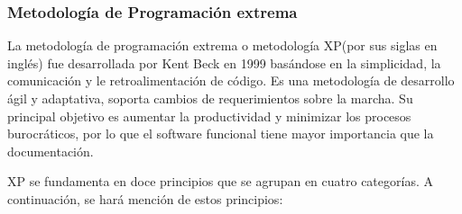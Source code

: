 \subsubsection{Metodología de Programación extrema}
La metodología de programación extrema o metodología XP(por sus siglas en inglés) fue desarrollada por Kent Beck en 1999 basándose en la simplicidad, la comunicación y le retroalimentación de código. Es una metodología de desarrollo ágil y adaptativa, soporta cambios de requerimientos sobre la marcha. Su principal objetivo es aumentar la productividad y minimizar los procesos burocráticos, por lo que el software funcional tiene mayor importancia que la documentación\cite{Ref_XP}.
\\
\par
  XP se fundamenta en doce principios que se agrupan en cuatro categorías. A continuación, se hará mención de estos principios:
